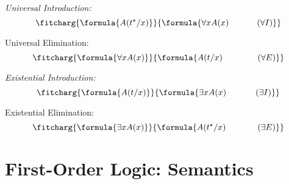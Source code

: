 \documentclass[a4paper, 11pt]{article} %
\begin{document}
\begin{multicols}{2}\it
Universal Introduction:\vspace{-.05in}
\begin{equation*}
\fitcharg{
\formula{A(t^\star/x)}
}{
\formula{\forall xA(x) \hspace*{.458in}(\forall I)}
}
\end{equation*}

Universal Elimination:\vspace{-.05in}
\begin{equation*}
\fitcharg{
\formula{\forall xA(x)}
}{
\formula{A(t/x) \hspace*{.568in}(\forall E)}
}
\end{equation*}
\end{multicols}
\vspace{-.05in}


\begin{multicols}{2}\it
Existential Introduction:\vspace{-.05in}
\begin{equation*}
\fitcharg{
\formula{A(t/x)}
}{
\formula{\exists xA(x) \hspace*{.477in}(\exists I)}
}
\end{equation*}

Existential Elimination:\vspace{-.05in}
\begin{equation*}
\fitcharg{
\formula{\exists xA(x)}
}{
\formula{A(t^\star/x) \hspace*{.515in}(\exists E)}
}
\end{equation*}
\end{multicols}
\vspace{-.05in}





\section*{\sc First-Order Logic: Semantics}
\end{document}
